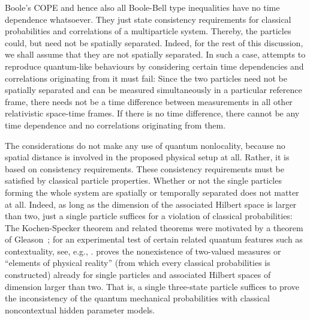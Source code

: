 \documentclass{epl}
\begin{document}
Boole's COPE and hence also all Boole-Bell type inequalities
have no time dependence whatsoever.
They just state consistency requirements for classical probabilities
and correlations of a multiparticle system.
Thereby, the particles could, but need not be spatially separated.
Indeed, for the rest of this discussion, we shall assume that they are
not spatially separated.
In such a case, attempts to reproduce
quantum-like behaviours by considering certain time dependencies and correlations
originating from it must fail:
Since  the two particles
need not be spatially separated
and can be measured simultaneously in a particular reference frame,
there needs not be a time difference between measurements
in all other relativistic space-time frames.
If there is no time difference,
there cannot be any time dependence and no correlations originating from them.

The considerations do not make any use of
quantum nonlocality,
because no spatial distance is involved in the
proposed physical setup at all.
Rather, it is based on consistency requirements.
These consistency requirements must be satisfied by classical particle properties.
Whether or not the single particles forming the whole system are spatially or temporally separated
does not matter at all.
Indeed, as long as the dimension of the associated Hilbert space
is larger than two, just a single particle suffices
for a violation of classical probabilities:
The Kochen-Specker theorem
\cite{specker-60,kochen1,peres,mermin-93,CalHerSvo,svozil-ql}
and related theorems
\cite{ZirlSchl-65,Alda,Alda2,kamber64,kamber65}
were motivated by a theorem of Gleason~\cite{Gleason}; for an experimental
test of certain related quantum features such as contextuality, see, e.g.,
\cite{redhead,cabello-98,Mi-Wein-Zu-2000,Si-Zu-Wein-Ze-2000}.
proves the nonexistence of two-valued measures or ``elements of physical reality''
(from which every classical probabilities is constructed)
already for single particles and associated Hilbert spaces of dimension larger than two.
That is, a single three-state particle suffices to prove the inconsistency
of the quantum mechanical probabilities with
classical noncontextual hidden parameter models.
\end{document}
